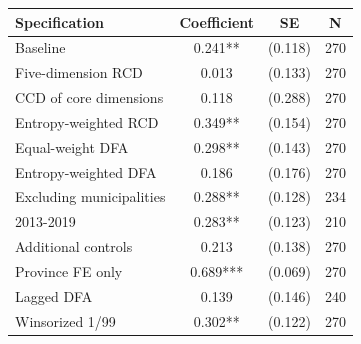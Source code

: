 \begin{tabular}{lccc}
\toprule
Specification & Coefficient & SE & N \\
\midrule
Baseline & 0.241** & (0.118) & 270 \\
Five-dimension RCD & 0.013 & (0.133) & 270 \\
CCD of core dimensions & 0.118 & (0.288) & 270 \\
Entropy-weighted RCD & 0.349** & (0.154) & 270 \\
Equal-weight DFA & 0.298** & (0.143) & 270 \\
Entropy-weighted DFA & 0.186 & (0.176) & 270 \\
Excluding municipalities & 0.288** & (0.128) & 234 \\
2013-2019 & 0.283** & (0.123) & 210 \\
Additional controls & 0.213 & (0.138) & 270 \\
Province FE only & 0.689*** & (0.069) & 270 \\
Lagged DFA & 0.139 & (0.146) & 240 \\
Winsorized 1/99 & 0.302** & (0.122) & 270 \\
\bottomrule
\end{tabular}